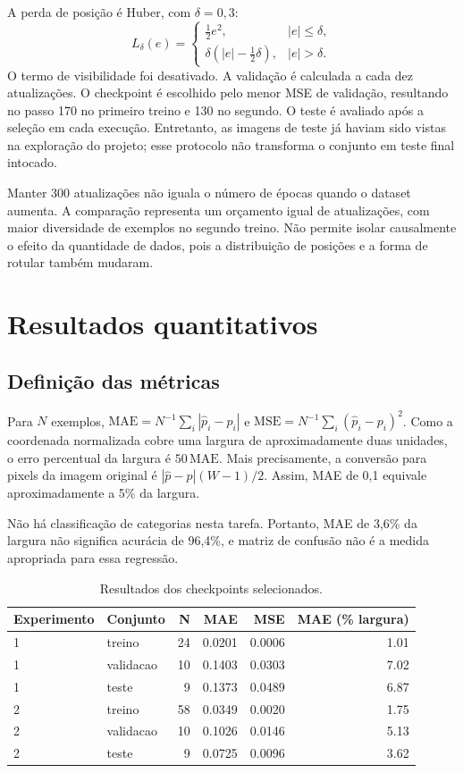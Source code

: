 \documentclass[a4paper,oneside,11pt]{article}
\begin{document}
A perda de posição é Huber, com $\delta=0,3$:
\begin{equation}
 L_\delta(e)=\begin{cases}\frac12e^2,&|e|\leq\delta,\\
 \delta(|e|-\frac12\delta),&|e|>\delta.
 \end{cases}
\end{equation}
O termo de visibilidade foi desativado. A validação é calculada a cada dez atualizações. O checkpoint é escolhido pelo menor MSE de validação, resultando no passo 170 no primeiro treino e 130 no segundo. O teste é avaliado após a seleção em cada execução. Entretanto, as imagens de teste já haviam sido vistas na exploração do projeto; esse protocolo não transforma o conjunto em teste final intocado.

Manter 300 atualizações não iguala o número de épocas quando o dataset aumenta. A comparação representa um orçamento igual de atualizações, com maior diversidade de exemplos no segundo treino. Não permite isolar causalmente o efeito da quantidade de dados, pois a distribuição de posições e a forma de rotular também mudaram.

\section{Resultados quantitativos}
\subsection{Definição das métricas}
Para $N$ exemplos, $\mathrm{MAE}=N^{-1}\sum_i|\hat p_i-p_i|$ e $\mathrm{MSE}=N^{-1}\sum_i(\hat p_i-p_i)^2$. Como a coordenada normalizada cobre uma largura de aproximadamente duas unidades, o erro percentual da largura é $50\,\mathrm{MAE}$. Mais precisamente, a conversão para pixels da imagem original é $|\hat p-p|(W-1)/2$. Assim, MAE de 0,1 equivale aproximadamente a 5\% da largura.

Não há classificação de categorias nesta tarefa. Portanto, MAE de 3,6\% da largura não significa acurácia de 96,4\%, e matriz de confusão não é a medida apropriada para essa regressão.
\begin{table}[ht]\centering\caption{Resultados dos checkpoints selecionados.}\begin{tabular}{llrrrr}\toprule Experimento & Conjunto & N & MAE & MSE & MAE (\% largura)\\\midrule
1 & treino & 24 & 0.0201 & 0.0006 & 1.01\\
1 & validacao & 10 & 0.1403 & 0.0303 & 7.02\\
1 & teste & 9 & 0.1373 & 0.0489 & 6.87\\
2 & treino & 58 & 0.0349 & 0.0020 & 1.75\\
2 & validacao & 10 & 0.1026 & 0.0146 & 5.13\\
2 & teste & 9 & 0.0725 & 0.0096 & 3.62\\
\bottomrule\end{tabular}\end{table}
\end{document}
